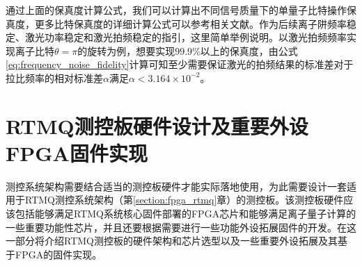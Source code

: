 通过上面的保真度计算公式，我们可以计算出不同信号质量下的单量子比特操作保真度，更多比特保真度的详细计算公式可以参考相关文献\cite[]{van_Dijk_Kawakami_Schouten_Veldhorst_Vandersypen_Babaie_Charbon_Sebastiano_2019}。作为后续离子阱频率稳定、激光功率稳定和激光拍频稳定的指引，这里简单举例说明。以激光拍频频率实现离子比特$\theta=\pi$的旋转为例，想要实现$99.9\%$以上的保真度，由公式\eqref{eq:frequency_noise_fidelity}计算可知至少需要保证激光的拍频结果的标准差对于拉比频率的相对标准差$\alpha$满足$\alpha < 3.164\times10^{-2}$。











\section[RTMQ测控板硬件设计及重要外设FPGA固件实现]{RTMQ测控板硬件设计及重要外设FPGA固件实现}

测控系统架构需要结合适当的测控板硬件才能实际落地使用，为此需要设计一套适用于RTMQ测控系统架构（第\ref{section:fpga_rtmq}章）的测控板。该测控板硬件应该包括能够满足RTMQ系统核心固件部署的FPGA芯片和能够满足离子量子计算的一些重要功能性芯片，并且还要根据需要进行一些功能外设拓展固件的开发。在这一部分将介绍RTMQ测控板的硬件架构和芯片选型以及一些重要外设拓展及其基于FPGA的固件实现。

